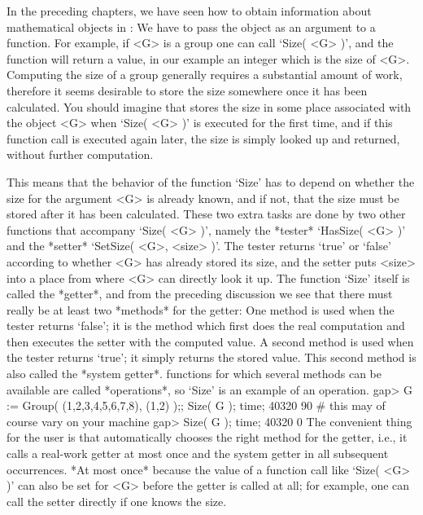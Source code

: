 



In the  preceding chapters, we have  seen how to obtain information about
mathematical objects in {\GAP}: We have to pass the object as an argument
to a function. For example, if <G> is a group one can call
`Size( <G> )', and the function will return a value,
in our example an integer  which is the  size of <G>. Computing
the size  of a  group generally  requires  a substantial amount  of work,
therefore it seems desirable to store the size somewhere once it has been
calculated. You should imagine that {\GAP} stores  the size in some place
associated  with the object  <G> when `Size( <G>  )'  is executed for the
first time, and if this function  call is executed  again later, the size
is simply looked up and returned, without further computation.

This means that the  behavior  of the  function  `Size' has to  depend on
whether the size for the argument <G> is already known,  and if not, that
the size  must be  stored after it  has been  calculated. These two extra
tasks are  done  by two other   functions that accompany `Size(   <G> )',
namely the *tester* `HasSize( <G> )'
and the *setter* `SetSize( <G>, <size> )'.
The tester returns `true' or `false' according to
whether <G> has already stored its size, and the setter puts <size> into
a place from where <G> can directly look it up.
The function `Size' itself is called the *getter*,
and from the preceding discussion we see
that there must really be at least two *methods* for the getter:
One method is used when the tester returns `false';
it is the method which first does the real computation and then executes
the setter with the computed value.
A second method is used when the tester returns `true';
it simply returns the stored value.
This second method is also called the *system getter*.
{\GAP} functions for which several methods can be available
are called *operations*, so `Size' is an example of an operation.
\begintt
gap> G := Group( (1,2,3,4,5,6,7,8), (1,2) );; Size( G ); time;
40320
90   # this may of course vary on your machine
gap> Size( G ); time;
40320
0
\endtt
The convenient thing  for the user  is that  {\GAP} automatically chooses
the right method  for the getter, i.e.,  it calls a real-work getter at
most once  and the system getter  in all subsequent occurrences. *At most
once* because the value of a function call like `Size( <G> )' can also be
set for <G>  before the getter  is called at all;
for example, one can call the setter directly if one knows the size.


